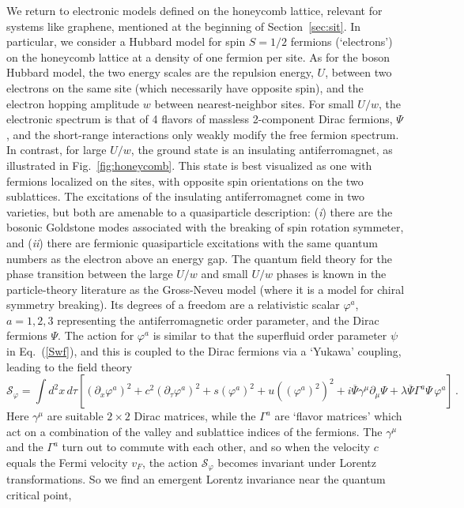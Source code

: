\documentclass[10pt, oneside]{book}
\def\be{\begin{equation}}
\def\ee{\end{equation}}
\begin{document}
\begin{doublespace}
We return to electronic models defined on the honeycomb lattice, relevant for systems like graphene, mentioned at the
beginning of Section~\ref{sec:sit}. In particular, we consider a Hubbard model for spin $S=1/2$ fermions (`electrons') on the honeycomb lattice at a density of one fermion per site. As for the boson Hubbard model, the two energy scales are the repulsion
energy, $U$, between two electrons on the same site (which necessarily have opposite spin), and the electron hopping amplitude $w$ between nearest-neighbor sites. For small $U/w$, the electronic spectrum is that of 4 flavors of massless 
2-component Dirac fermions, $\Psi$, and the short-range interactions only weakly modify the free fermion spectrum.
In contrast, for large $U/w$, the ground state is an insulating antiferromagnet, as illustrated in Fig.~\ref{fig:honeycomb}.
This state is best visualized as one with fermions localized on the sites, with opposite spin orientations on the two
sublattices. The excitations of the insulating antiferromagnet come in two varieties, but both are amenable to a quasiparticle
description: ({\em i\/}) there are the bosonic Goldstone modes associated with the breaking of spin rotation symmeter, and 
({\em ii\/}) there are fermionic quasiparticle excitations with the same quantum numbers as the electron above an energy gap.
The quantum field theory for the phase transition \cite{honeycomb15} between the large $U/w$ and small $U/w$ phases is known in the particle-theory
literature as the Gross-Neveu model (where it is a model for chiral symmetry breaking). Its degrees of a freedom are a relativistic
scalar $\varphi^a$, $a=1,2,3$ representing the antiferromagnetic order parameter, and the Dirac fermions $\Psi$. The action
for $\varphi^a$ is similar to that the superfluid order parameter $\psi$ in Eq.~(\ref{Swf}), and this is coupled to
the Dirac fermions via a `Yukawa' coupling, leading to the field theory
\be
\mathcal{S}_\varphi = \int d^2 x \, d\tau \left[ (\partial_x \varphi^a )^2 + c^2 (\partial_\tau \varphi^a )^2 + s (\varphi^a)^2 + u \left((\varphi^a)^2\right)^2 + i \overline{\Psi} \gamma^\mu \partial_\mu \Psi + \lambda \overline{\Psi} \Gamma^a \Psi \, \varphi^a \right] \,. \label{Sgn}
\ee
Here $\gamma^\mu$ are suitable $2 \times 2$ Dirac matrices, while the $\Gamma^a$ are `flavor matrices' which act
on a combination of the valley and sublattice indices of the fermions. The $\gamma^\mu$ and the $\Gamma^a$ turn
out to commute with each other, and so when the velocity $c$ equals the Fermi velocity $v_F$, the action $\mathcal{S}_\varphi$ becomes invariant under Lorentz transformations. So we find an emergent Lorentz invariance near the quantum critical point,

\end{doublespace}
\end{document}
